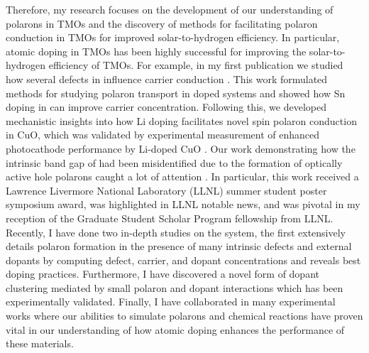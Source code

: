 Therefore, my research focuses on the development of our understanding of polarons in TMOs and the discovery of methods for facilitating polaron conduction in TMOs for improved solar-to-hydrogen efficiency. In particular, atomic doping in TMOs has been highly successful for improving the solar-to-hydrogen efficiency of TMOs. For example, in my first publication we studied how several defects in  influence carrier conduction \cite{smart2017effect}. This work formulated methods for studying polaron transport in doped systems and showed how Sn doping in  can improve carrier concentration. Following this, we developed mechanistic insights into how Li doping facilitates novel spin polaron conduction in CuO, which was validated by experimental measurement of enhanced photocathode performance by Li-doped CuO \cite{smart2018mechanistic}. Our work demonstrating how the intrinsic band gap of  had been misidentified due to the formation of optically active hole polarons caught a lot of attention \cite{smart2019optical}. In particular, this work received a Lawrence Livermore National Laboratory (LLNL) summer student poster symposium award, was highlighted in LLNL notable news, and was pivotal in my reception of the Graduate Student Scholar Program fellowship from LLNL. Recently, I have done two in-depth studies on the  system, the first extensively details polaron formation in the presence of many intrinsic defects and external dopants by computing defect, carrier, and dopant concentrations and reveals best doping practices. Furthermore, I have discovered a novel form of dopant clustering mediated by small polaron and dopant interactions which has been experimentally validated. Finally, I have collaborated in many experimental works where our abilities to simulate polarons \cite{wheeler2019combined,radmilovic2020combined} and chemical reactions \cite{lu2017nitrogen,kou2018theoretical,kou2020carbon,lu2019ruthenium} have proven vital in our understanding of how atomic doping enhances the performance of these materials.
